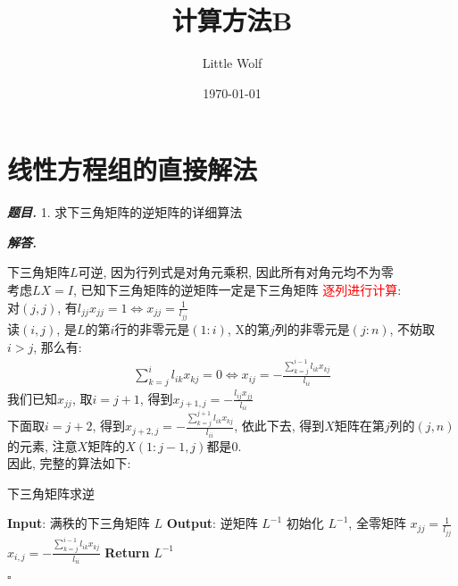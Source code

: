 \documentclass[10pt, a4paper, oneside]{ctexart}
\title{\textbf{计算方法B}}
\author{Little Wolf}
\date{\today}
\newenvironment{problem}{\begin{framed}\par\noindent\textbf{\textit{题目. }}}{\end{framed}\par}
\newenvironment{solution}{%
  \par\noindent\textbf{\textit{解答. }}\ignorespaces
}{%
  \hfill\ensuremath{\square}\par %
}
\begin{document}
\maketitle


\section{线性方程组的直接解法}
\begin{problem}
    1. 求下三角矩阵的逆矩阵的详细算法
\end{problem}
\begin{solution}
下三角矩阵$L$可逆, 因为行列式是对角元乘积, 因此所有对角元均不为零\\
考虑$LX=I$, 已知下三角矩阵的逆矩阵一定是下三角矩阵
\textcolor{red}{逐列进行计算}:\\
对$(j,j)$, 有$l_{jj}x_{jj}=1 \iff x_{jj}=\frac{1}{l_{jj}}$\\
读$(i,j)$, 是$L$的第$i$行的非零元是$(1:i)$, X的第$j$列的非零元是$(j:n)$, 不妨取$i>j$, 那么有:
\begin{align*}
    \sum_{k=j}^{i} l_{ik}x_{kj}=0 \iff x_{ij}=-\frac{\sum_{k=j}^{i-1}l_{ik}x_{kj}}{l_{ii}}
\end{align*}
我们已知$x_{jj}$, 取$i=j+1$, 得到$x_{j+1,j}=-\frac{l_{ij}x_{jj}}{l_{ii}}$\\
下面取$i=j+2$, 得到$x_{j+2,j}=-\frac{\sum_{k=j}^{j+1}l_{ik}x_{kj}}{l_{ii}}$, 依此下去, 得到$X$矩阵在第$j$列的$(j,n)$的元素, 注意$X$矩阵的$X(1:j-1, j)$都是$0$.\\
因此, 完整的算法如下:
\begin{algorithm}
    \caption{下三角矩阵求逆}
    \begin{algorithmic}
        \State \textbf{Input}: 满秩的下三角矩阵 \( L \)
        \State \textbf{Output}: 逆矩阵 \( L^{-1} \)
        \State 初始化 \( L^{-1} \), 全零矩阵
        \State $x_{jj}=\frac{1}{l_{jj}}$
            \State $x_{i,j}=-\frac{\sum_{k=j}^{i-1}l_{ik}x_{kj}}{l_{ii}}$
            \EndFor
        \EndFor
        \State \textbf{Return} \( L^{-1} \)
    \end{algorithmic}
    \end{algorithm} 
\end{solution}
\end{document}
